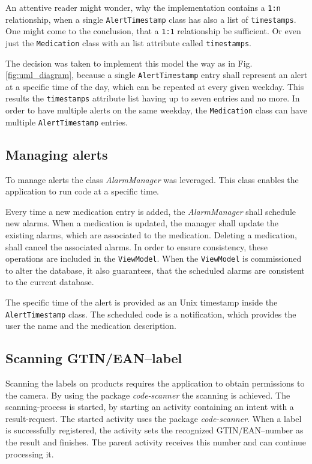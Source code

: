 \documentclass[conference]{IEEEtran}
\begin{document}
An attentive reader might wonder, why the implementation contains a \texttt{1:n} relationship, when a single
\texttt{AlertTimestamp} class has also a list of \texttt{timestamps}. One might come to the conclusion, that a
\texttt{1:1} relationship be sufficient. Or even just the \texttt{Medication} class with an list attribute called
\texttt{timestamps}.

The decision was taken to implement this model the way as in Fig. \ref{fig:uml_diagram}, because a single
\texttt{AlertTimestamp} entry shall represent an alert at a specific time of the day, which can be repeated
at every given weekday. This results the \texttt{timestamps} attribute list having up to seven entries and no
more. In order to have multiple alerts on the same weekday, the \texttt{Medication} class can have multiple 
\texttt{AlertTimestamp} entries.

\subsection{Managing alerts}

To manage alerts the class \textit{AlarmManager} \cite{alarmmanager} was leveraged. This class enables the
application to run code at a specific time.

Every time a new medication entry is added, the \textit{AlarmManager} shall schedule new alarms. When a
medication is updated, the manager shall update the existing alarms, which are associated to the
medication. Deleting a medication, shall cancel the associated alarms. In order to ensure consistency, these
operations are included in the \texttt{ViewModel}. When the \texttt{ViewModel} is commissioned to alter the 
database, it also guarantees, that the scheduled alarms are consistent to the current database.

The specific time of the alert is provided as an Unix timestamp inside the \texttt{AlertTimestamp} class.
The scheduled code is a notification, which provides the user the name and the medication description.

\subsection{Scanning GTIN/EAN--label}

Scanning the labels on products requires the application to obtain permissions to the camera. By using the package
\textit{code-scanner} \cite{barcode} the scanning is achieved. The scanning-process is started, by 
starting an activity containing an intent with a result-request. The started activity uses the package
\textit{code-scanner}. When a label is successfully registered, the activity sets the recognized GTIN/EAN--number
as the result and finishes. The parent activity receives this number and can continue processing it.
\end{document}
